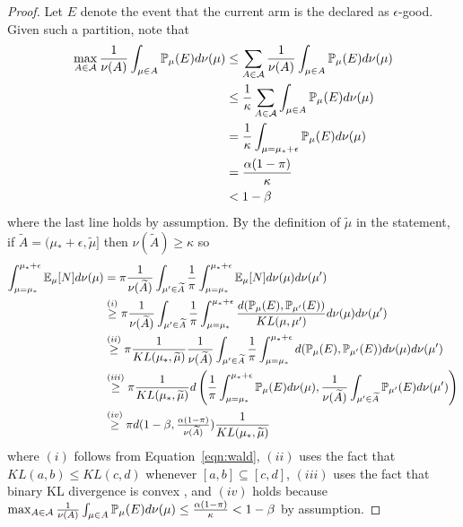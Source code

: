 \begin{proof}
Let $E$ denote the event that the current arm is the declared as $\epsilon$-good.
Given such a partition, note that
\begin{align*}
\max_{A \in \mathcal{A}} \frac{1}{\nu(A)} \int_{\mu \in A} \mathbb{P}_\mu(E) d\nu(\mu) &\leq \sum_{A \in \mathcal{A}} \frac{1}{\nu(A)} \int_{\mu \in A} \mathbb{P}_\mu(E) d\nu(\mu) \\
&\leq \frac{1}{\kappa} \sum_{A \in \mathcal{A}} \int_{\mu \in A} \mathbb{P}_\mu(E) d\nu(\mu) \\
&= \frac{1}{\kappa} \int_{\mu = \mu_* + \epsilon} \mathbb{P}_\mu(E) d\nu(\mu) \\
&=  \frac{\alpha(1-\pi)}{\kappa}  \\
&< 1-\beta
\end{align*}
where the last line holds by assumption.
By the definition of $\widetilde{\mu}$ in the statement, if $\widetilde{A} = (\mu_*+\epsilon, \widetilde{\mu}]$ then $\nu(\widetilde{A}) \geq \kappa$ so
\begin{align*}
\int_{\mu=\mu_*}^{\mu_*+\epsilon} \mathbb{E}_\mu[N] d\nu(\mu) &= \pi \frac{1}{\nu(\widetilde{A})}  \int_{\mu' \in \widetilde{A}} \frac{1}{\pi} \int_{\mu=\mu_*}^{\mu_*+\epsilon} \mathbb{E}_\mu[N] d\nu(\mu) d\nu(\mu')\\
&\overset{(i)}{\geq} \pi  \frac{1}{\nu(\widetilde{A})} \int_{\mu' \in \widetilde{A}} \frac{1}{\pi} \int_{\mu=\mu_*}^{\mu_*+\epsilon} \frac{d( \mathbb{P}_\mu(E), \mathbb{P}_{\mu'}(E) )}{KL(\mu,\mu')}  d\nu(\mu) d\nu(\mu') \\
&\overset{(ii)}{\geq} \pi  \frac{1}{KL(\mu_*,\widetilde{\mu})} \frac{1}{\nu(\widetilde{A})} \int_{\mu' \in \widetilde{A}} \frac{1}{\pi} \int_{\mu=\mu_*}^{\mu_*+\epsilon} d( \mathbb{P}_\mu(E), \mathbb{P}_{\mu'}(E) )  d\nu(\mu) d\nu(\mu') \\
&\overset{(iii)}{\geq}  \pi  \frac{1}{KL(\mu_*,\widetilde{\mu})} d\left( \frac{1}{\pi} \int_{\mu=\mu_*}^{\mu_*+\epsilon} \mathbb{P}_\mu(E)d\nu(\mu) , \frac{1}{\nu(\widetilde{A})} \int_{\mu' \in \widetilde{A}}  \mathbb{P}_{\mu'}(E) d\nu(\mu') \right)    \\
&\overset{(iv)}{\geq} \pi  d(1-\beta,  \tfrac{\alpha(1-\pi)}{\nu(\widetilde{A})}) \frac{1}{KL(\mu_*,\widetilde{\mu})} 
\end{align*}
where $(i)$ follows from Equation~\ref{eqn:wald}, 
$(ii)$ uses the fact that $KL(a,b) \leq KL(c,d)$ whenever $[a,b] \subseteq [c,d]$, 
$(iii)$ uses the fact that binary KL divergence is convex \cite{Cover:2006:EIT:1146355}, 
and $(iv)$ holds because $\max_{A \in \mathcal{A}} \frac{1}{\nu(A)}\int_{\mu \in A} \mathbb{P}_\mu(E) d\nu(\mu) \leq \frac{\alpha(1-\pi)}{\kappa} < 1-\beta$ by assumption.



\end{proof}
